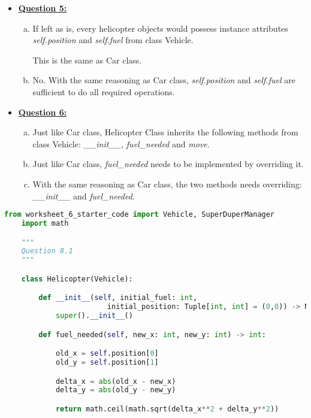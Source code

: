 \documentclass[12pt]{article}
\begin{document}
\begin{itemize}
    \item \underline{\textbf{Question 5:}}
    \begin{enumerate}[a.]
        \item If left as is, every helicopter objects would possess instance attributes
        \textit{self.position} and \textit{self.fuel} from class Vehicle.

        \bigskip

        This is the same as Car class.

        \item No. With the same reasoning as Car class, \textit{self.position}
        and \textit{self.fuel} are sufficient to do all required operations.

    \end{enumerate}
    \item \underline{\textbf{Question 6:}}
    \begin{enumerate}[a.]
        \item Just like Car class, Helicopter Class inherits the following methods
        from class Vehicle: \textit{\_\_init\_\_}, \textit{fuel\_needed} and \textit{move}.

        \item Just like Car class, \textit{fuel\_needed} needs to be
        implemented by overriding it.

        \item With the same reasoning as Car class, the two methods needs
        overriding: \textit{\_\_init\_\_} and \textit{fuel\_needed}.

    \end{enumerate}

\end{itemize}

\begin{lstlisting}[language=Python]
    from worksheet_6_starter_code import Vehicle, SuperDuperManager
    import math

    """
    Question 8.1
    """

    class Helicopter(Vehicle):

        def __init__(self, initial_fuel: int,
                        initial_position: Tuple[int, int] = (0,0)) -> None:
            super().__init__()

        def fuel_needed(self, new_x: int, new_y: int) -> int:

            old_x = self.position[0]
            old_y = self.position[1]

            delta_x = abs(old_x - new_x)
            delta_y = abs(old_y - new_y)

            return math.ceil(math.sqrt(delta_x**2 + delta_y**2))

\end{lstlisting}
\end{document}
